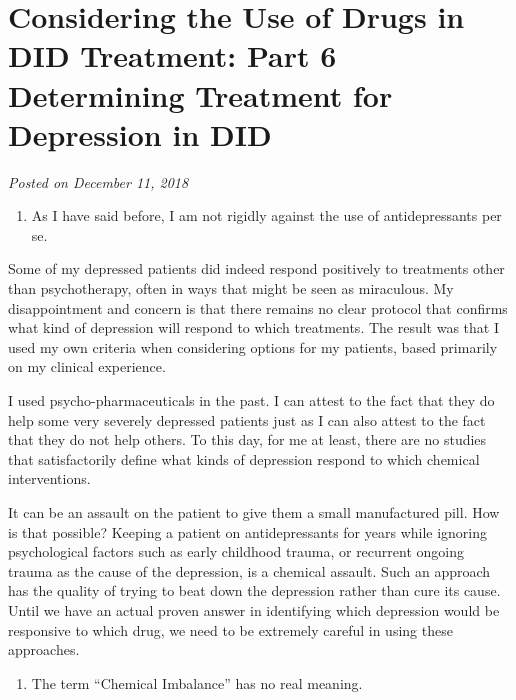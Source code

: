 \documentclass[]{book}
\providecommand{\tightlist}{%
  \setlength{\itemsep}{0pt}\setlength{\parskip}{0pt}}
\begin{document}
\hypertarget{considering-the-use-of-drugs-in-did-treatment-part-6-determining-treatment-for-depression-in-did}{%
\section{Considering the Use of Drugs in DID Treatment: Part 6 Determining Treatment for Depression in DID}\label{considering-the-use-of-drugs-in-did-treatment-part-6-determining-treatment-for-depression-in-did}}

\emph{Posted on December 11, 2018}

\begin{enumerate}
\def\labelenumi{\arabic{enumi}.}
\setcounter{enumi}{3}
\tightlist
\item
  As I have said before, I am not rigidly against the use of antidepressants per se.
\end{enumerate}

Some of my depressed patients did indeed respond positively to treatments other than psychotherapy, often in ways that might be seen as miraculous. My disappointment and concern is that there remains no clear protocol that confirms what kind of depression will respond to which treatments. The result was that I used my own criteria when considering options for my patients, based primarily on my clinical experience.

I used psycho-pharmaceuticals in the past. I can attest to the fact that they do help some very severely depressed patients just as I can also attest to the fact that they do not help others. To this day, for me at least, there are no studies that satisfactorily define what kinds of depression respond to which chemical interventions.

It can be an assault on the patient to give them a small manufactured pill. How is that possible? Keeping a patient on antidepressants for years while ignoring psychological factors such as early childhood trauma, or recurrent ongoing trauma as the cause of the depression, is a chemical assault. Such an approach has the quality of trying to beat down the depression rather than cure its cause. Until we have an actual proven answer in identifying which depression would be responsive to which drug, we need to be extremely careful in using these approaches.

\begin{enumerate}
\def\labelenumi{\arabic{enumi}.}
\setcounter{enumi}{4}
\tightlist
\item
  The term ``Chemical Imbalance'' has no real meaning.
\end{enumerate}
\end{document}
